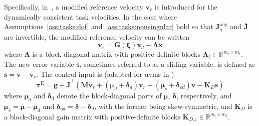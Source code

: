 \documentclass[../main.tex]{subfiles}
\begin{document}
Specifically, in~\cite{Garofalo2020}, a modified reference velocity $\bm{v}_r$ is introduced for the dynamically consistent task velocities. In the case where Assumptions~\ref{ass:tasks:dof} and~\ref{ass:tasks:nonsingular} hold so that $\bm{J}^{\textrm{aug}}_q$ and $\bar{\bm{J}}$ are invertible, the modified reference velocity can be written
\begin{equation}
    \bm{v}_r = \bm{G}(\bm{\xi}) \dot{\bm{x}}_d - \bm{\Lambda} \tilde{\bm{x}}
\end{equation}
where $\bm{\Lambda}$ is a block diagonal matrix with positive-definite blocks $\bm{\Lambda}_i \in \mathbb{R}^{m_i \times m_i}$. The new error variable $\bm{s}$, sometimes referred to as a sliding variable, is defined as $\bm{s} = \bm{v} -\bm{v}_r $. The control input is (adapted for \gls{uvms} in \cite{DyrhaugTveter2023})
\begin{equation}\label{eq:tasks:tau_Garofalo}
    \bm{\tau}^{\textrm{E}} = \bm{g} + \bar{\bm{J}}^\top \left( \bar{\bm{M}} \dot{\bm{v}}_r + \left( \bm{\mu}_d + \bm{\delta}_d \right) \bm{v}_r + \left( \bm{\mu}_s + \bm{\delta}_{od} \right) \bm{v} - \bm{K}_D \bm{s}\right)
\end{equation}
where $\bm{\mu}_d$ and $\bm{\delta}_d$ denote the block-diagonal parts of $\bm{\mu},\, \bm{\delta}$, respectively, and $\bm{\mu}_s = \bm{\mu} - \bm{\mu}_d$ and $\bm{\delta}_{od} = \bm{\delta} - \bm{\delta}_d$, with the former being skew-symmetric, and $\bm{K}_D$ is a block-diagonal gain matrix with positive-definite blocks $\bm{K}_{D,i} \in \mathbb{R}^{m_i \times m_i}$.
\end{document}
